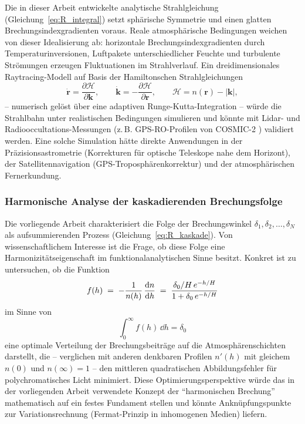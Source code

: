 \documentclass[12pt,a4paper]{article}
\begin{document}
Die in dieser Arbeit entwickelte analytische Strahlgleichung
(Gleichung~\ref{eq:R_integral}) setzt sphärische Symmetrie und
einen glatten Brechungsindexgradienten voraus.
Reale atmosphärische Bedingungen weichen von dieser Idealisierung ab:
horizontale Brechungsindexgradienten durch Temperaturinversionen,
Luftpakete unterschiedlicher Feuchte und turbulente Strömungen
erzeugen Fluktuationen im Strahlverlauf.
Ein dreidimensionales Raytracing-Modell auf Basis der Hamiltonschen
Strahlgleichungen
\begin{equation}
  \dot{\mathbf{r}} = \frac{\partial \mathcal{H}}{\partial \mathbf{k}}, \qquad
  \dot{\mathbf{k}} = -\frac{\partial \mathcal{H}}{\partial \mathbf{r}},
  \qquad \mathcal{H} = n(\mathbf{r}) - |\mathbf{k}|,
  \label{eq:hamilton_ray}
\end{equation}
-- numerisch gelöst über eine adaptiven Runge-Kutta-Integration --
würde die Strahlbahn unter realistischen Bedingungen simulieren
und könnte mit Lidar- und Radiooccultations-Messungen
(z.\,B. GPS-RO-Profilen von COSMIC-2 \citep{Anthes2008}) validiert werden.
Eine solche Simulation hätte direkte Anwendungen in der
Präzisionsastrometrie (Korrekturen für optische Teleskope nahe
dem Horizont), der Satellitennavigation (GPS-Troposphärenkorrektur)
und der atmosphärischen Fernerkundung.

\subsubsection{Harmonische Analyse der kaskadierenden Brechungsfolge}

Die vorliegende Arbeit charakterisiert die Folge der Brechungswinkel
$\delta_1, \delta_2, \ldots, \delta_N$ als aufsummierenden Prozess
(Gleichung~\ref{eq:R_kaskade}).
Von wissenschaftlichem Interesse ist die Frage, ob diese Folge
eine Harmonizitätseigenschaft im funktionalanalytischen Sinne besitzt.
Konkret ist zu untersuchen, ob die Funktion
\begin{equation}
  f(h) \;=\; -\frac{1}{n(h)}\,\dv{n}{h}
           \;=\; \frac{\delta_0/H\,e^{-h/H}}{1 + \delta_0\,e^{-h/H}}
  \label{eq:harmonik_f}
\end{equation}
im Sinne von
\begin{equation}
  \int_0^\infty f(h)\,\dd h = \delta_0
  \label{eq:harmonik_integral}
\end{equation}
eine optimale Verteilung der Brechungsbeiträge auf die Atmosphärenschichten
darstellt, die -- verglichen mit anderen denkbaren Profilen $n'(h)$ mit
gleichem $n(0)$ und $n(\infty)=1$ -- den mittleren quadratischen
Abbildungsfehler für polychromatisches Licht minimiert.
Diese Optimierungsperspektive würde das in der vorliegenden Arbeit
verwendete Konzept der ``harmonischen Brechung'' mathematisch auf ein
festes Fundament stellen und könnte Anknüpfungspunkte zur
Variationsrechnung (Fermat-Prinzip in inhomogenen Medien) liefern.
\end{document}
